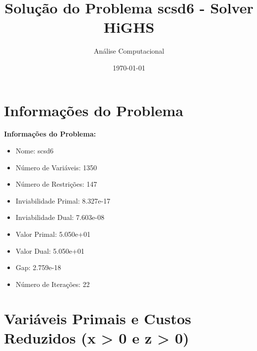\documentclass[12pt]{article}
\title{Solução do Problema scsd6 - Solver HiGHS}
\author{Análise Computacional}
\date{\today}
\begin{document}
\maketitle

\section{Informações do Problema}

\textbf{Informações do Problema:}
\begin{itemize}
\item Nome: scsd6
\item Número de Variáveis: 1350
\item Número de Restrições: 147
\item Inviabilidade Primal: 8.327e-17
\item Inviabilidade Dual: 7.603e-08
\item Valor Primal: 5.050e+01
\item Valor Dual: 5.050e+01
\item Gap: 2.759e-18
\item Número de Iterações: 22
\end{itemize}


\section{Variáveis Primais e Custos Reduzidos (x > 0 e z > 0)}
\end{document}

